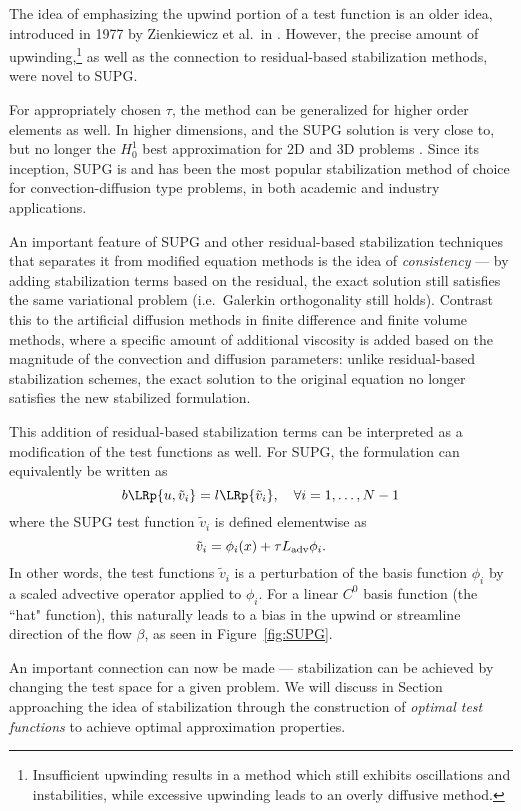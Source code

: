 The idea of emphasizing the upwind portion of a test function is an older idea, introduced in 1977 by Zienkiewicz et al.\ in \cite{zienkUpwind}.  However, the precise amount of upwinding,\footnote{Insufficient upwinding results in a method which still exhibits oscillations and instabilities, while excessive upwinding leads to an overly diffusive method.} as well as the connection to residual-based stabilization methods, were novel to SUPG.  

For appropriately chosen $\tau$, the method can be generalized for higher order elements as well.  In higher dimensions, and the SUPG solution is very close to, but no longer the $H^1_0$ best approximation for 2D and 3D problems \cite{HughesSangalliSUPG}.  Since its inception, SUPG is and has been the most popular stabilization method of choice for convection-diffusion type problems, in both academic and industry applications. 

An important feature of SUPG and other residual-based stabilization techniques that separates it from modified equation methods is the idea of \textit{consistency} --- by adding stabilization terms based on the residual, the exact solution still satisfies the same variational problem (i.e.\ Galerkin orthogonality still holds). Contrast this to the artificial diffusion methods in finite difference and finite volume methods, where a specific amount of additional viscosity is added based on the magnitude of the convection and diffusion parameters: unlike residual-based stabilization schemes, the exact solution to the original equation no longer satisfies the new stabilized formulation.  

This addition of residual-based stabilization terms can be interpreted as a modification of the test functions as well.  For SUPG, the formulation can equivalently be written as
\[
b\LRp{u,\tilde{v}_{i}} = l\LRp{\tilde{v}_{i}}, \quad \forall i = 1,\ldots,N-1
\]
where the SUPG test function $\tilde{v}_{i}$ is defined elementwise as
\[
\tilde{v}_{i} = \phi_i(x) + \tau L_{\rm adv} \phi_i.  
\]
In other words, the test functions $\tilde{v}_{i}$ is a perturbation of the basis function $\phi_i$ by a scaled advective operator applied to $\phi_i$.  For a linear $C^0$ basis function (the ``hat" function), this naturally leads to a bias in the upwind or streamline direction of the flow $\beta$, as seen in Figure~\ref{fig:SUPG}.  

An important connection can now be made --- stabilization can be achieved by changing the test space for a given problem.  We will discuss in Section~ approaching the idea of stabilization through the construction of \textit{optimal test functions} to achieve optimal approximation properties. 

